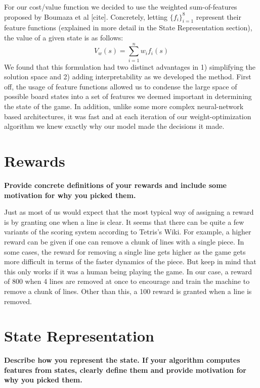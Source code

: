 \documentclass[12pt,letterpaper]{article}
\begin{document}
For our cost/value function we decided to use the weighted sum-of-features proposed by Boumaza et al [cite]. Concretely, letting $\{f_i\}_{i=1}^{8}$ represent their feature functions (explained in more detail in the State Representation section), the value of a given state is as follows: $$V_w(s) = \sum_{i=1}^nw_if_i(s)$$
We found that this formulation had two distinct advantages in 1) simplifying the solution space and 2) adding interpretability as we developed the method. First off, the usage of feature functions allowed us to condense the large space of possible board states into a set of features we deemed important in determining the state of the game. In addition, unlike some more complex neural-network based architectures, it was fast and at each iteration of our weight-optimization algorithm we knew exactly why our model made the decisions it made.

\section{Rewards}
\textbf{Provide concrete definitions of your rewards and include some motivation for why you picked them.}

Just as most of us would expect that the most typical way of assigning a reward is by granting one when a line is clear. It seems that there can be quite a few variants of the scoring system according to Tetris's Wiki. For example, a higher reward can be given if one can remove a chunk of lines with a single piece. In some cases, the reward for removing a single line gets higher as the game gets more difficult in terms of the faster dynamics of the piece. But keep in mind that this only works if it was a human being playing the game. In our case, a reward of 800 when 4 lines are removed at once to encourage and train the machine to remove a chunk of lines. Other than this, a 100 reward is granted when a line is removed.

\section{State Representation}
\textbf{Describe how you represent the state. If your algorithm computes features from states, clearly define them and provide motivation for why you picked them.} 
\end{document}

